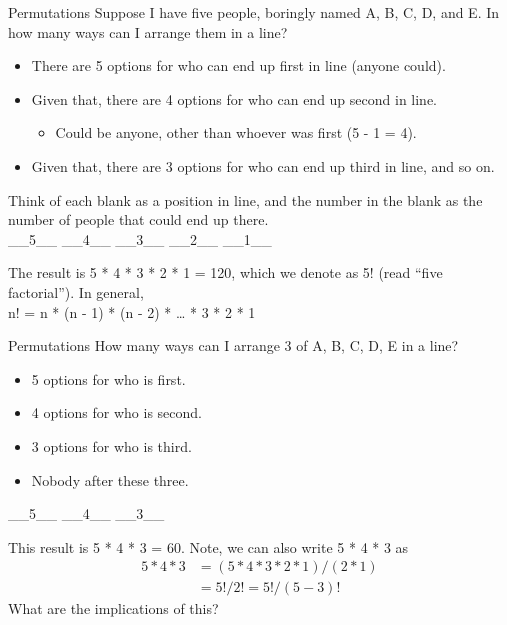 \documentclass[aspectratio=169]{../latex_main/tntbeamer}  %
\begin{document}
	\begin{frame}{Permutations}
	    Suppose I have five people, boringly named A, B, C, D, and E. In how many ways can I arrange them in a line?
	    \begin{itemize}
	        \item There are 5 options for who can end up first in line (anyone could).
	        \item Given that, there are 4 options for who can end up second in line.
	        \begin{itemize}
	            \item Could be anyone, other than whoever was first (5 - 1 = 4).
	        \end{itemize}
	        \item Given that, there are 3 options for who can end up third in line, and so on.
	    \end{itemize}
	    	       
	       Think of each blank as a position in line, and the number in the blank as the number of people that could end up there.\\
	       
	       \_\_5\_\_ \hspace{2cm}		\_\_4\_\_ \hspace{2cm}		\_\_3\_\_ \hspace{2cm}		\_\_2\_\_	 \hspace{2cm}	\_\_1\_\_

        The result is 5 * 4 * 3 * 2 * 1 = 120, which we denote as 5! (read “five factorial”). In general,\\
        \hspace{4cm} n! = n * (n - 1) * (n - 2) * … * 3 * 2 * 1


	\end{frame}
	
	\begin{frame}{Permutations}
	    How many ways can I arrange 3 of {A, B, C, D, E} in a line?

	    \begin{itemize}
	        \item 5 options for who is first.
	        \item 4 options for who is second.
	        \item 3 options for who is third.
	        \item Nobody after these three.
	    \end{itemize}

	      \hspace{4cm} \_\_5\_\_ \hspace{2cm}		\_\_4\_\_ \hspace{2cm}		\_\_3\_\_ 

       This result is 5 * 4 * 3 = 60. Note, we can also write 5 * 4 * 3 as\\
        \begin{align*}
            5 * 4 * 3 &= (5 * 4 * 3 * 2 * 1) / (2 * 1) \\
            &= 5! / 2! = 5! / (5 - 3)!
        \end{align*}
    What are the implications of this?
	\end{frame}
	
\end{document}
